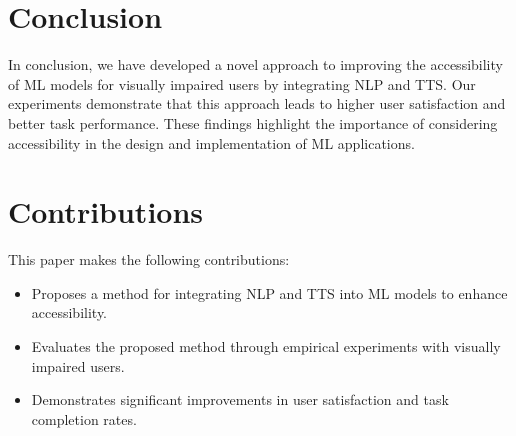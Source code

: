 \documentclass{article}
\begin{document}
\section{Conclusion}
In conclusion, we have developed a novel approach to improving the accessibility of ML models for visually impaired users by integrating NLP and TTS. Our experiments demonstrate that this approach leads to higher user satisfaction and better task performance. These findings highlight the importance of considering accessibility in the design and implementation of ML applications.

\section{Contributions}
This paper makes the following contributions:
\begin{itemize}
    \item Proposes a method for integrating NLP and TTS into ML models to enhance accessibility.
    \item Evaluates the proposed method through empirical experiments with visually impaired users.
    \item Demonstrates significant improvements in user satisfaction and task completion rates.
\end{itemize}



\end{document}
